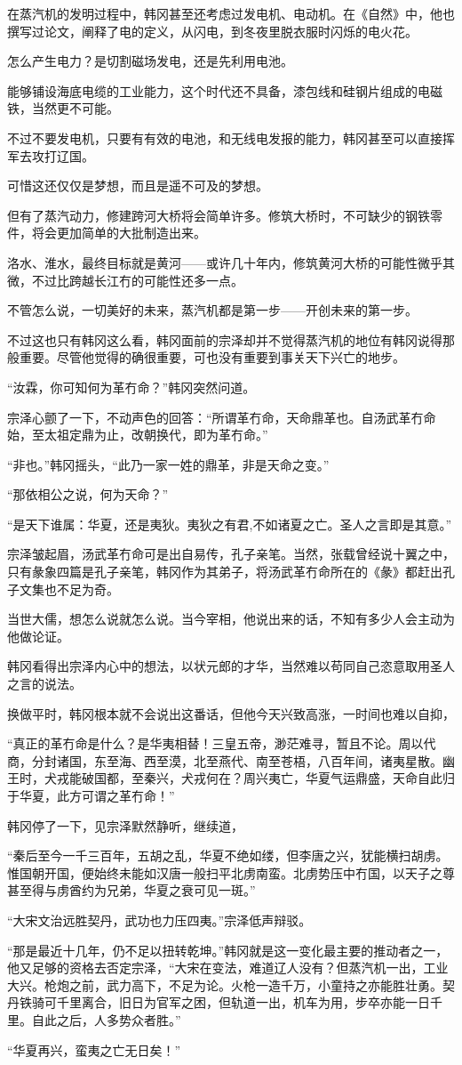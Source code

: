 在蒸汽机的发明过程中，韩冈甚至还考虑过发电机、电动机。在《自然》中，他也撰写过论文，阐释了电的定义，从闪电，到冬夜里脱衣服时闪烁的电火花。

怎么产生电力？是切割磁场发电，还是先利用电池。

能够铺设海底电缆的工业能力，这个时代还不具备，漆包线和硅钢片组成的电磁铁，当然更不可能。

不过不要发电机，只要有有效的电池，和无线电发报的能力，韩冈甚至可以直接挥军去攻打辽国。

可惜这还仅仅是梦想，而且是遥不可及的梦想。

但有了蒸汽动力，修建跨河大桥将会简单许多。修筑大桥时，不可缺少的钢铁零件，将会更加简单的大批制造出来。

洛水、淮水，最终目标就是黄河——或许几十年内，修筑黄河大桥的可能性微乎其微，不过比跨越长江冇的可能性还多一点。

不管怎么说，一切美好的未来，蒸汽机都是第一步——开创未来的第一步。

不过这也只有韩冈这么看，韩冈面前的宗泽却并不觉得蒸汽机的地位有韩冈说得那般重要。尽管他觉得的确很重要，可也没有重要到事关天下兴亡的地步。

“汝霖，你可知何为革冇命？”韩冈突然问道。

宗泽心颤了一下，不动声色的回答：“所谓革冇命，天命鼎革也。自汤武革冇命始，至太祖定鼎为止，改朝换代，即为革冇命。”

“非也。”韩冈摇头，“此乃一家一姓的鼎革，非是天命之变。”

“那依相公之说，何为天命？”

“是天下谁属：华夏，还是夷狄。夷狄之有君,不如诸夏之亡。圣人之言即是其意。”

宗泽皱起眉，汤武革冇命可是出自易传，孔子亲笔。当然，张载曾经说十翼之中，只有彖象四篇是孔子亲笔，韩冈作为其弟子，将汤武革冇命所在的《彖》都赶出孔子文集也不足为奇。

当世大儒，想怎么说就怎么说。当今宰相，他说出来的话，不知有多少人会主动为他做论证。

韩冈看得出宗泽内心中的想法，以状元郎的才华，当然难以苟同自己恣意取用圣人之言的说法。

换做平时，韩冈根本就不会说出这番话，但他今天兴致高涨，一时间也难以自抑，

“真正的革冇命是什么？是华夷相替！三皇五帝，渺茫难寻，暂且不论。周以代商，分封诸国，东至海、西至漠，北至燕代、南至苍梧，八百年间，诸夷星散。幽王时，犬戎能破国都，至秦兴，犬戎何在？周兴夷亡，华夏气运鼎盛，天命自此归于华夏，此方可谓之革冇命！”

韩冈停了一下，见宗泽默然静听，继续道，

“秦后至今一千三百年，五胡之乱，华夏不绝如缕，但李唐之兴，犹能横扫胡虏。惟国朝开国，便始终未能如汉唐一般扫平北虏南蛮。北虏势压中冇国，以天子之尊甚至得与虏酋约为兄弟，华夏之衰可见一斑。”

“大宋文治远胜契丹，武功也力压四夷。”宗泽低声辩驳。

“那是最近十几年，仍不足以扭转乾坤。”韩冈就是这一变化最主要的推动者之一，他又足够的资格去否定宗泽，“大宋在变法，难道辽人没有？但蒸汽机一出，工业大兴。枪炮之前，武力高下，不足为论。火枪一造千万，小童持之亦能胜壮勇。契丹铁骑可千里离合，旧日为官军之困，但轨道一出，机车为用，步卒亦能一日千里。自此之后，人多势众者胜。”

“华夏再兴，蛮夷之亡无日矣！”
